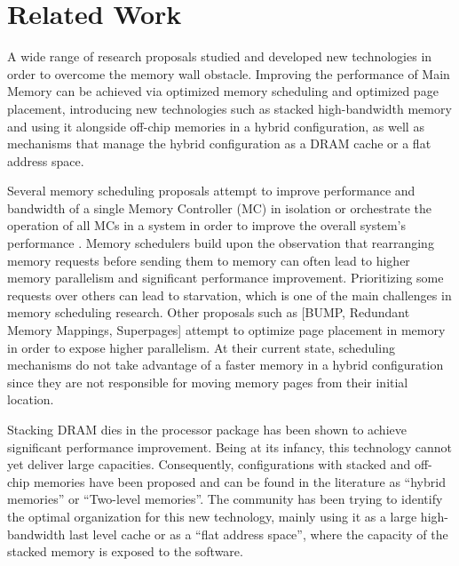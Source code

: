 
\section{Related Work}
\label{sec:Background}

A wide range of research proposals studied and developed new technologies in order to overcome the memory wall obstacle. Improving the performance of Main Memory can be achieved via optimized memory scheduling and optimized page placement, introducing new technologies such as stacked high-bandwidth memory and using it alongside off-chip memories in a hybrid configuration, as well as mechanisms that manage the hybrid configuration as a DRAM cache or a flat address space.

Several memory scheduling proposals attempt to improve performance and bandwidth of a single Memory Controller (MC) in isolation \cite{TCM,PARBS,SMS} or orchestrate the operation of all MCs in a system in order to improve the overall system's performance \cite{ATLAS}. Memory schedulers build upon the observation that rearranging memory requests before sending them to memory can often lead to higher memory parallelism and significant performance improvement. Prioritizing some requests over others can lead to starvation, which is one of the main challenges in memory scheduling research. Other proposals such as [BUMP, Redundant Memory Mappings, Superpages]\cite{BUMP,RMM,SUPERPAGES} attempt to optimize page placement in memory in order to expose higher parallelism. At their current state, scheduling mechanisms do not take advantage of a faster memory in a hybrid configuration since they are not responsible for moving memory pages from their initial location.

Stacking DRAM dies in the processor package has been shown to achieve significant performance improvement. Being at its infancy, this technology cannot yet deliver large capacities\cite{JEDEC-HBM-REVISED}. Consequently, configurations with stacked and off-chip memories have been proposed \cite{LOH-HYBRID,qureshi-micro2012} and can be found in the literature as ``hybrid memories'' or ``Two-level memories''. The community has been trying to identify the optimal organization for this new technology, mainly using it as a large high-bandwidth last level cache or as a ``flat address space'', where the capacity of the stacked memory is exposed to the software.

